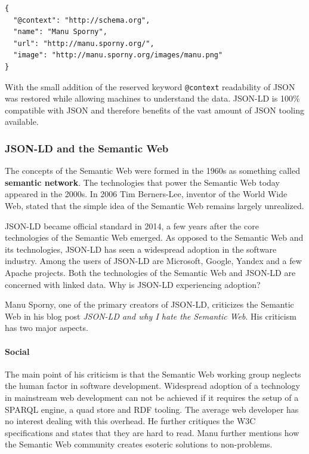 \lstset{language=JSON}
\begin{lstlisting}[caption=Compacted data of a person, label=jsonldcompacted]
{
  "@context": "http://schema.org",
  "name": "Manu Sporny",
  "url": "http://manu.sporny.org/",
  "image": "http://manu.sporny.org/images/manu.png"
}
\end{lstlisting}

With the small addition of the reserved keyword \lstinline{@context} readability of JSON was restored while allowing machines to understand the data. JSON-LD is 100\% compatible with JSON and therefore benefits of the vast amount of JSON tooling available.


\subsubsection{JSON-LD and the Semantic Web}
The concepts of the Semantic Web were formed in the 1960s as something called \textbf{semantic network}. The technologies that power the Semantic Web today appeared in the 2000s. In 2006 Tim Berners-Lee, inventor of the World Wide Web, stated that the simple idea of the Semantic Web remains largely unrealized. \citep{semanticwebrevisited}

JSON-LD became official standard in 2014, a few years after the core technologies of the Semantic Web emerged. As opposed to the Semantic Web and its technologies, JSON-LD has seen a widespread adoption in the software industry. Among the users of JSON-LD are Microsoft, Google, Yandex and a few Apache projects. \citep{jsonldusers} Both the technologies of the Semantic Web and JSON-LD are concerned with linked data. Why is JSON-LD experiencing adoption?

Manu Sporny, one of the primary creators of JSON-LD, criticizes the Semantic Web in his blog post \textit{JSON-LD and why I hate the Semantic Web}. His criticism has two major aspects.

\paragraph{Social}
The main point of his criticism is that the Semantic Web working group neglects the human factor in software development. Widespread adoption of a technology in mainstream web development can not be achieved if it requires the setup of a SPARQL engine, a quad store and RDF tooling. The average web developer has no interest dealing with this overhead. He further critiques the W3C specifications and states that they are hard to read. \citep{semanticwebrevisited} Manu further mentions how the Semantic Web community creates esoteric solutions to non-problems. \citep{semanticwebrevisited}

